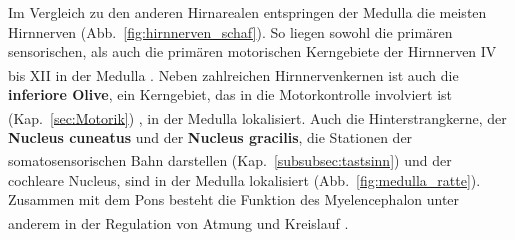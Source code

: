 \documentclass[12pt,a4paper,pdftex]{article}
\begin{document}
\noindent Im Vergleich zu den anderen Hirnarealen entspringen der Medulla die meisten Hirnnerven (Abb.~\ref{fig:hirnnerven_schaf}). So liegen sowohl die primären sensorischen, als auch die primären motorischen Kerngebiete der Hirnnerven IV bis XII in der Medulla \textsuperscript{\cite[14]{penzlin2005tierphys}}. Neben zahlreichen Hirnnervenkernen ist auch die \textbf{inferiore Olive}, ein Kerngebiet, das in die Motorkontrolle involviert ist (Kap.~\ref{sec:Motorik})  \textsuperscript{\cite[9]{crossman2014neuroanatomy}}, in der Medulla lokalisiert. Auch die Hinterstrangkerne, der \textbf{Nucleus cuneatus} und der \textbf{Nucleus gracilis}, die Stationen der somatosensorischen Bahn darstellen (Kap.~\ref{subsubsec:tastsinn}) \textsuperscript{\cite[5]{trepel2011neuroanatomie}} und der cochleare Nucleus, sind in der Medulla lokalisiert (Abb.~\ref{fig:medulla_ratte}). Zusammen mit dem Pons besteht die Funktion des Myelencephalon unter anderem in der Regulation von Atmung und Kreislauf \textsuperscript{\cite[14]{penzlin2005tierphys}}.
\end{document}
